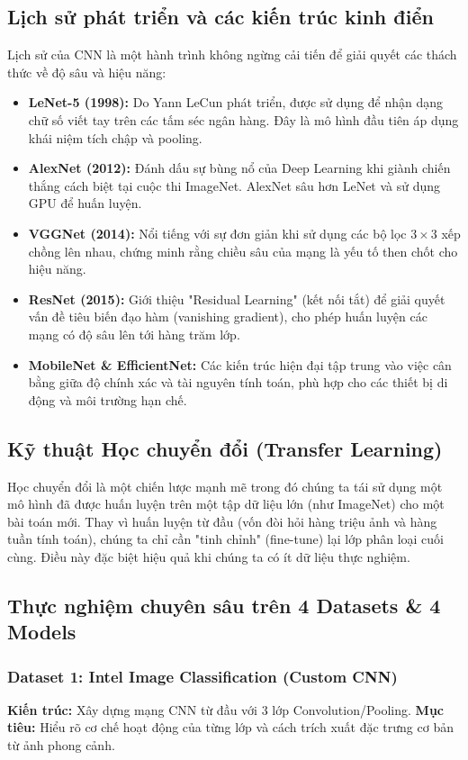 \subsection{Lịch sử phát triển và các kiến trúc kinh điển}
Lịch sử của CNN là một hành trình không ngừng cải tiến để giải quyết các thách thức về độ sâu và hiệu năng:
\begin{itemize}
    \item \textbf{LeNet-5 (1998):} Do Yann LeCun phát triển, được sử dụng để nhận dạng chữ số viết tay trên các tấm séc ngân hàng. Đây là mô hình đầu tiên áp dụng khái niệm tích chập và pooling.
    \item \textbf{AlexNet (2012):} Đánh dấu sự bùng nổ của Deep Learning khi giành chiến thắng cách biệt tại cuộc thi ImageNet. AlexNet sâu hơn LeNet và sử dụng GPU để huấn luyện.
    \item \textbf{VGGNet (2014):} Nổi tiếng với sự đơn giản khi sử dụng các bộ lọc $3 \times 3$ xếp chồng lên nhau, chứng minh rằng chiều sâu của mạng là yếu tố then chốt cho hiệu năng.
    \item \textbf{ResNet (2015):} Giới thiệu "Residual Learning" (kết nối tắt) để giải quyết vấn đề tiêu biến đạo hàm (vanishing gradient), cho phép huấn luyện các mạng có độ sâu lên tới hàng trăm lớp.
    \item \textbf{MobileNet \& EfficientNet:} Các kiến trúc hiện đại tập trung vào việc cân bằng giữa độ chính xác và tài nguyên tính toán, phù hợp cho các thiết bị di động và môi trường hạn chế.
\end{itemize}

\subsection{Kỹ thuật Học chuyển đổi (Transfer Learning)}
Học chuyển đổi là một chiến lược mạnh mẽ trong đó chúng ta tái sử dụng một mô hình đã được huấn luyện trên một tập dữ liệu lớn (như ImageNet) cho một bài toán mới. Thay vì huấn luyện từ đầu (vốn đòi hỏi hàng triệu ảnh và hàng tuần tính toán), chúng ta chỉ cần "tinh chỉnh" (fine-tune) lại lớp phân loại cuối cùng. Điều này đặc biệt hiệu quả khi chúng ta có ít dữ liệu thực nghiệm.

\subsection{Thực nghiệm chuyên sâu trên 4 Datasets \& 4 Models}

\subsubsection{Dataset 1: Intel Image Classification (Custom CNN)}
\textbf{Kiến trúc:} Xây dựng mạng CNN từ đầu với 3 lớp Convolution/Pooling.
\textbf{Mục tiêu:} Hiểu rõ cơ chế hoạt động của từng lớp và cách trích xuất đặc trưng cơ bản từ ảnh phong cảnh.


